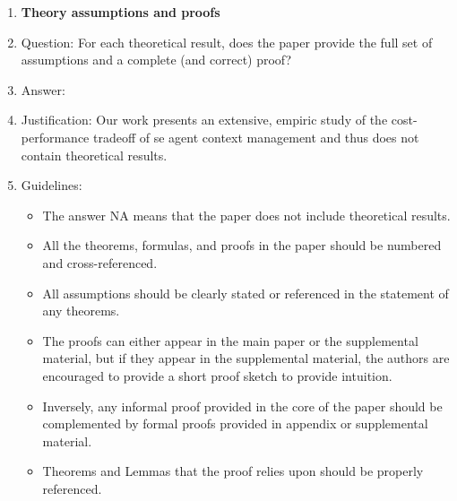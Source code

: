 \documentclass{article}
\begin{document}
\begin{enumerate}
\item {\bf Theory assumptions and proofs}
    \item[] Question: For each theoretical result, does the paper provide the full set of assumptions and a complete (and correct) proof?
    \item[] Answer: \answerNA{} %
    \item[] Justification: Our work presents an extensive, empiric study of the cost-performance tradeoff of \ac{se} agent context management and thus does not contain theoretical results.
    \item[] Guidelines:
    \begin{itemize}
        \item The answer NA means that the paper does not include theoretical results. 
        \item All the theorems, formulas, and proofs in the paper should be numbered and cross-referenced.
        \item All assumptions should be clearly stated or referenced in the statement of any theorems.
        \item The proofs can either appear in the main paper or the supplemental material, but if they appear in the supplemental material, the authors are encouraged to provide a short proof sketch to provide intuition. 
        \item Inversely, any informal proof provided in the core of the paper should be complemented by formal proofs provided in appendix or supplemental material.
        \item Theorems and Lemmas that the proof relies upon should be properly referenced. 
    \end{itemize}


\end{enumerate}
\end{document}
